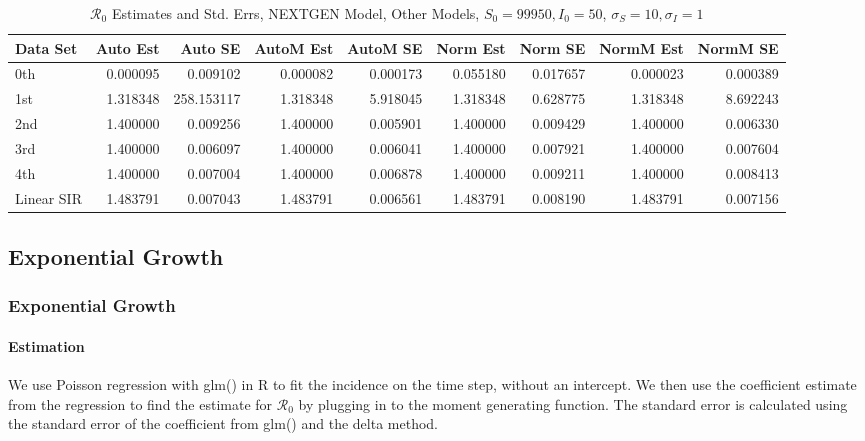 \documentclass[12pt]{article}
\newcommand{\rr}{\ensuremath{\mathcal{R}_0}}
\begin{document}
\begin{table}[H]
	
	\caption{$\rr$ Estimates and Std. Errs, NEXTGEN Model,
		Other Models, $S_0 = 99950, I_0 = 50$, 
		$\sigma_S = 10, \sigma_I = 1$}
	\begin{footnotesize}
		\hskip -1cm
	\begin{tabular}{l|r|r|r|r|r|r|r|r}
		\hline
		Data Set & Auto Est & Auto SE & AutoM Est & AutoM SE & Norm Est & Norm SE & NormM Est & NormM SE\\
		\hline
		0th & 0.000095 & 0.009102 & 0.000082 & 0.000173 & 0.055180 & 0.017657 & 0.000023 & 0.000389\\
		\hline
		1st & 1.318348 & 258.153117 & 1.318348 & 5.918045 & 1.318348 & 0.628775 & 1.318348 & 8.692243\\
		\hline
		2nd & 1.400000 & 0.009256 & 1.400000 & 0.005901 & 1.400000 & 0.009429 & 1.400000 & 0.006330\\
		\hline
		3rd & 1.400000 & 0.006097 & 1.400000 & 0.006041 & 1.400000 & 0.007921 & 1.400000 & 0.007604\\
		\hline
		4th & 1.400000 & 0.007004 & 1.400000 & 0.006878 & 1.400000 & 0.009211 & 1.400000 & 0.008413\\
		\hline
		Linear SIR & 1.483791 & 0.007043 & 1.483791 & 0.006561 & 1.483791 & 0.008190 & 1.483791 & 0.007156\\
		\hline
	\end{tabular}
\end{footnotesize}
\end{table}

\subsection{Exponential Growth}

\subsubsection{Exponential Growth}

\paragraph{Estimation}

We use Poisson regression with glm() in R to fit the incidence on the time step, without an intercept. We then use the coefficient estimate from the regression to find the estimate for $\rr$ by plugging in to the moment generating function. The standard error is calculated using the standard error of the coefficient from glm() and the delta method.
\end{document}
